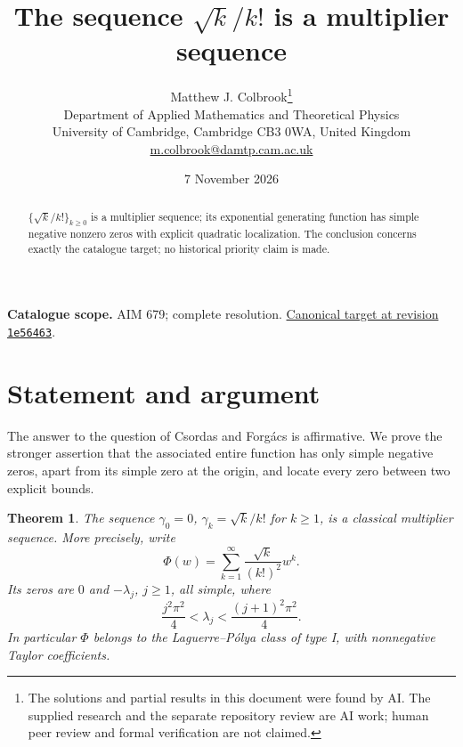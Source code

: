 \documentclass[11pt,a4paper]{article}
\newtheorem{theorem}{Theorem}[section]
\theoremstyle{remark}
\begin{document}
\title{The sequence \texorpdfstring{$\sqrt{k}/k!$}{sqrt(k)/k!} is a multiplier sequence}
\author{Matthew J. Colbrook\thanks{The solutions and partial results in this document were found by AI. The supplied research and the separate repository review are AI work; human peer review and formal verification are not claimed.}\\[4pt]
\small Department of Applied Mathematics and Theoretical Physics\\
\small University of Cambridge, Cambridge CB3 0WA, United Kingdom\\
\small\href{mailto:m.colbrook@damtp.cam.ac.uk}{m.colbrook@damtp.cam.ac.uk}}
\date{7 November 2026}
\maketitle
\begin{abstract}
$\{\sqrt{k}/k!\}_{k\ge0}$ is a multiplier sequence; its exponential generating function has simple negative nonzero zeros with explicit quadratic localization. The conclusion concerns exactly the catalogue target; no historical priority claim is made.
\end{abstract}
\noindent\textbf{Catalogue scope.} AIM 679; complete resolution. \href{https://github.com/MColbrook/AIM/blob/1e564633494c109edfd3ec46da1366adcff925a5/problems/679-the-square-root-factorial-multiplier-sequence.md}{Canonical target at revision \texttt{1e56463}}.


\section{Statement and argument}
\label{sec:679}

The answer to the question of Csordas and Forg\'acs
\cite{CsordasForgacs} is affirmative.  We prove the stronger assertion
that the associated entire function has only simple negative zeros,
apart from its simple zero at the origin, and locate every zero between
two explicit bounds.

\begin{theorem}
The sequence $\gamma_0=0$, $\gamma_k=\sqrt{k}/k!$ for $k\ge1$, is a
classical multiplier sequence.  More precisely, write
\[
 \Phi(w)=\sum_{k=1}^{\infty}\frac{\sqrt{k}}{(k!)^2}w^k.
\]
Its zeros are $0$ and $-\lambda_j$, $j\ge1$, all simple, where
\[
 \frac{j^2\pi^2}{4}<\lambda_j<\frac{(j+1)^2\pi^2}{4}.
\]
In particular $\Phi$ belongs to the Laguerre--P\'olya class of type I,
with nonnegative Taylor coefficients.
\end{theorem}
\end{document}
